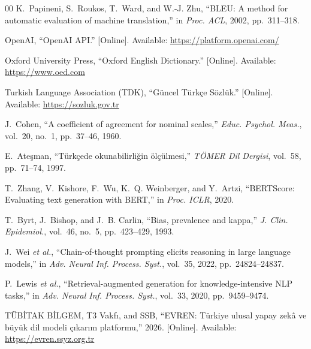 \documentclass[conference]{IEEEtran}
\begin{document}
\begin{thebibliography}{00}
K.~Papineni, S.~Roukos, T.~Ward, and W.-J. Zhu, ``{BLEU}: A method for automatic evaluation of machine translation,'' in \emph{Proc. ACL}, 2002, pp.~311--318.

OpenAI, ``OpenAI API.'' [Online]. Available: \url{https://platform.openai.com/}

Oxford University Press, ``Oxford English Dictionary.'' [Online]. Available: \url{https://www.oed.com}

Turkish Language Association (TDK), ``G{\"u}ncel T{\"u}rk{\c{c}}e S{\"o}zl{\"u}k.'' [Online]. Available: \url{https://sozluk.gov.tr}

J.~Cohen, ``A coefficient of agreement for nominal scales,'' \emph{Educ. Psychol. Meas.}, vol.~20, no.~1, pp.~37--46, 1960.

E.~Ate\c{s}man, ``T{\"u}rk{\c{c}}ede okunabilirli{\u{g}}in {\"o}l{\c{c}}{\"u}lmesi,'' \emph{T{\"O}MER Dil Dergisi}, vol.~58, pp.~71--74, 1997.

T.~Zhang, V.~Kishore, F.~Wu, K.~Q. Weinberger, and Y.~Artzi, ``{BERTScore}: Evaluating text generation with {BERT},'' in \emph{Proc. ICLR}, 2020.

T.~Byrt, J.~Bishop, and J.~B. Carlin, ``Bias, prevalence and kappa,'' \emph{J. Clin. Epidemiol.}, vol.~46, no.~5, pp.~423--429, 1993.

J.~Wei \emph{et al.}, ``Chain-of-thought prompting elicits reasoning in large language models,'' in \emph{Adv. Neural Inf. Process. Syst.}, vol.~35, 2022, pp.~24824--24837.

P.~Lewis \emph{et al.}, ``Retrieval-augmented generation for knowledge-intensive {NLP} tasks,'' in \emph{Adv. Neural Inf. Process. Syst.}, vol.~33, 2020, pp.~9459--9474.

T{\"U}B{\.I}TAK B{\.I}LGEM, T3 Vakf{\i}, and SSB, ``{EVREN}: T{\"u}rkiye ulusal yapay zek{\^a} ve b{\"u}y{\"u}k dil modeli {\c{c}}{\i}kar{\i}m platformu,'' 2026. [Online]. Available: \url{https://evren.ssyz.org.tr}

\end{thebibliography}
\end{document}
